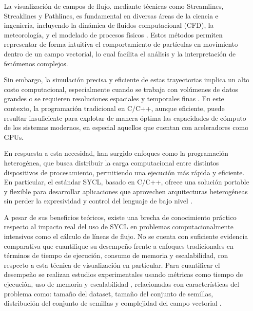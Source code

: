 \documentclass[12pt]{article}
\begin{document}
La visualización de campos de flujo, mediante técnicas como Streamlines, Streaklines y Pathlines, es fundamental en diversas áreas de la ciencia e ingeniería, incluyendo la dinámica de fluidos computacional (CFD), la meteorología, y el modelado de procesos físicos \cite{camp_streamline_2011}. Estos métodos permiten representar de forma intuitiva el comportamiento de partículas en movimiento dentro de un campo vectorial, lo cual facilita el análisis y la interpretación de fenómenos complejos.



Sin embargo, la simulación precisa y eficiente de estas trayectorias implica un alto costo computacional, especialmente cuando se trabaja con volúmenes de datos grandes o se requieren resoluciones espaciales y temporales finas \cite{pugmire_scalable_2009}. En este contexto, la programación tradicional en C/C++, aunque eficiente, puede resultar insuficiente para explotar de manera óptima las capacidades de cómputo de los sistemas modernos, en especial aquellos que cuentan con aceleradores como GPUs.



En respuesta a esta necesidad, han surgido enfoques como la programación heterogénea, que busca distribuir la carga computacional entre distintos dispositivos de procesamiento, permitiendo una ejecución más rápida y eficiente. En particular, el estándar SYCL, basado en C/C++, ofrece una solución portable y flexible para desarrollar aplicaciones que aprovechen arquitecturas heterogéneas sin perder la expresividad y control del lenguaje de bajo nivel \cite{keryell_sycl_2019}.


A pesar de sus beneficios teóricos, existe una brecha de conocimiento práctico respecto al impacto real del uso de SYCL en problemas computacionalmente intensivos como el cálculo de líneas de flujo. No se cuenta con suficiente evidencia comparativa que cuantifique su desempeño frente a enfoques tradicionales en términos de tiempo de ejecución, consumo de memoria y escalabilidad, con respecto a esta técnica de visualización en particular. Para cuantificar el desempeño se realizan estudios experimentales usando métricas como tiempo de ejecución, uso de memoria y escalabilidad \cite{camp_gpu_2013}, relacionadas con características del problema como: tamaño del dataset, tamaño del conjunto de semillas, distribución del conjunto de semillas y complejidad del campo vectorial \cite{camp_streamline_2011}.
\end{document}
